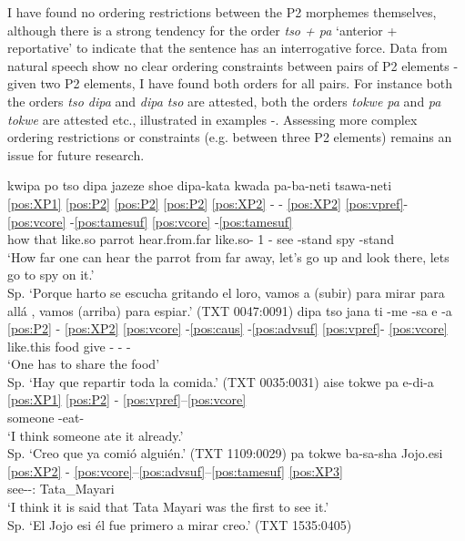 \documentclass[output=paper,hidelinks]{langscibook}
\begin{document}
\largerpage
I have found no ordering restrictions between the P2 morphemes themselves, although there is a strong tendency for the order \textit{tso + pa} `anterior + reportative' to indicate that the sentence has an interrogative force. Data from natural speech show no clear ordering constraints between pairs of P2 elements - given two P2 elements, I have found both orders for all pairs. For instance both the orders \textit{tso dipa} and \textit{dipa tso} are attested, both the orders \textit{tokwe pa} and \textit{pa tokwe} are attested etc., illustrated in examples -. Assessing more complex ordering restrictions or constraints (e.g. between three P2 elements) remains an issue for future research.

\ea 
 \ea \label{ex:tsodipa}
    \glll kwipa po tso dipa jazeze shoe dipa-kata kwada pa-ba-neti tsawa-neti  \\
 	\ref{pos:XP1} \ref{pos:P2} \ref{pos:P2} \ref{pos:P2} \ref{pos:XP2} - - \ref{pos:XP2} \ref{pos:vpref}- \ref{pos:vcore} -\ref{pos:tamesuf} \ref{pos:vcore} -\ref{pos:tamesuf}  \\
    how that \Ant{} like.so parrot hear.from.far like.so- \Aug{} 1\Pl{} \Post{}- see -stand spy -stand    \\
	\glt `How far one can hear the parrot from far away, let's go up and look there, lets go to spy on it.' \\ Sp. `Porque harto se escucha gritando el loro, vamos a (subir) para mirar para allá , vamos (arriba) para espiar.'
 \hfill (TXT 0047:0091)
 \ex \label{ex:dipatso}
    \glll dipa tso jana ti -me -sa e -a	 \\
    \ref{pos:P2} - \ref{pos:XP2} \ref{pos:vcore} -\ref{pos:caus} -\ref{pos:advsuf} \ref{pos:vpref}- \ref{pos:vcore}  \\
 	  like.this \Ant{} food give -\Caus{} -\Frust{} \E{} -\Aux \\
	\glt `One has to share the food' \\ Sp. `Hay que repartir toda la comida.'
 \hfill (TXT 0035:0031)
 \ex \label{ex:tokwepa}
    \glll aise tokwe pa e-di-a \\
    \ref{pos:XP1} \ref{pos:P2} - \ref{pos:vpref}--\ref{pos:vcore}  \\
 	  someone \Epis{} \Rep{} \E{}-eat-\E{} \\
	\glt `I think someone ate it already.' \\ Sp. `Creo que ya comió alguién.'
 \hfill (TXT 1109:0029)
 \ex \label{ex:patokwe}
    \glll pa tokwe ba-sa-sha Jojo.esi \\
    \ref{pos:XP2} - \ref{pos:vcore}--\ref{pos:advsuf}--\ref{pos:tamesuf} \ref{pos:XP3}  \\
 	\Rep{} \Epis{} see-\Frust{}-\Dist{}:\Pst{} Tata\_Mayari \\
	\glt `I think it is said that Tata Mayari was the first to see it.' \\ Sp. `El Jojo esi él fue primero a mirar creo.'
 \hfill (TXT 1535:0405)
 \z
\z
\end{document}
